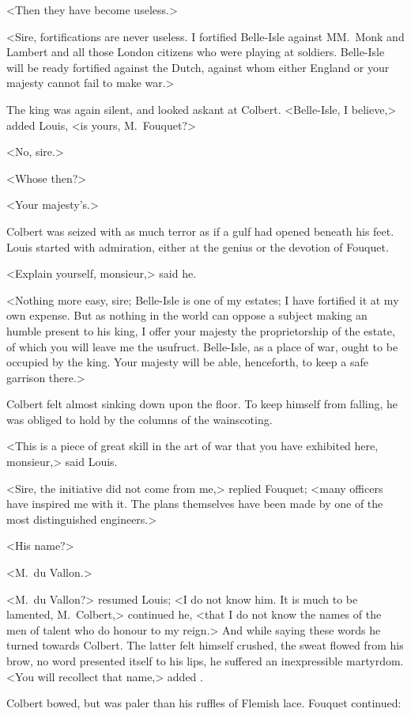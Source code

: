<Then they have become useless.>

<Sire, fortifications are never useless. I fortified Belle-Isle against MM.~Monk and Lambert and all those London citizens who were playing at soldiers. Belle-Isle will be ready fortified against the Dutch, against whom either England or your majesty cannot fail to make war.>

The king was again silent, and looked askant at Colbert. <Belle-Isle, I believe,> added Louis, <is yours, M.~Fouquet?>

<No, sire.>

<Whose then?>

<Your majesty's.>

Colbert was seized with as much terror as if a gulf had opened beneath his feet. Louis started with admiration, either at the genius or the devotion of Fouquet.

<Explain yourself, monsieur,> said he.

<Nothing more easy, sire; Belle-Isle is one of my estates; I have fortified it at my own expense. But as nothing in the world can oppose a subject making an humble present to his king, I offer your majesty the proprietorship of the estate, of which you will leave me the usufruct. Belle-Isle, as a place of war, ought to be occupied by the king. Your majesty will be able, henceforth, to keep a safe garrison there.>

Colbert felt almost sinking down upon the floor. To keep himself from falling, he was obliged to hold by the columns of the wainscoting.

<This is a piece of great skill in the art of war that you have exhibited here, monsieur,> said Louis.

<Sire, the initiative did not come from me,> replied Fouquet; <many officers have inspired me with it. The plans themselves have been made by one of the most distinguished engineers.>

<His name?>

<M.~du Vallon.>

<M.~du Vallon?> resumed Louis; <I do not know him. It is much to be lamented, M.~Colbert,> continued he, <that I do not know the names of the men of talent who do honour to my reign.> And while saying these words he turned towards Colbert. The latter felt himself crushed, the sweat flowed from his brow, no word presented itself to his lips, he suffered an inexpressible martyrdom. <You will recollect that name,> added .

Colbert bowed, but was paler than his ruffles of Flemish lace. Fouquet continued:


